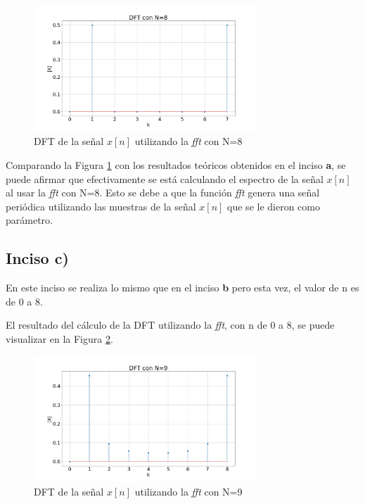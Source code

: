 \documentclass{article}
\begin{document}
\begin{figure}[H]
\centering
\includegraphics[width=0.75\textwidth]{Img/punto_1_b.png}
\caption{DFT de la señal $x[n]$ utilizando la \textit{fft} con N=8}
\label{fig.2b}
\end{figure}

Comparando la Figura \ref{fig.2b} con los resultados teóricos obtenidos en el inciso \textbf{a}, se puede afirmar que efectivamente se está calculando el espectro de la señal $x[n]$ al usar la \textit{fft} con N=8. Esto se debe a que la función \textit{fft} genera una señal periódica utilizando las muestras de la señal $x[n]$ que se le dieron como parámetro. 


\subsection*{Inciso c)}
En este inciso se realiza lo mismo que en el inciso \textbf{b} pero esta vez, el valor de n es de 0 a 8. 


El resultado del cálculo de la DFT utilizando la \textit{fft}, con n de 0 a 8, se puede visualizar en la Figura \ref{fig.1c}.

\begin{figure}[H]
\centering
\includegraphics[width=0.75\textwidth]{Img/punto_1_c.png}
\caption{DFT de la señal $x[n]$ utilizando la \textit{fft} con N=9}
\label{fig.1c}
\end{figure}
\end{document}
